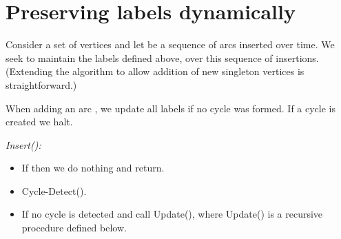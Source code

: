 \documentclass[11pt]{article}
\theoremstyle{plain}
\theoremstyle{definition}
\theoremstyle{remark}
\numberwithin{equation}{section}
\begin{document}
\section{Preserving labels dynamically} \label{sec:2directions}


Consider a set of vertices  and let  be a sequence of arcs inserted over time. We seek to
maintain the labels  defined above, over this sequence of
insertions. (Extending the algorithm to allow addition of new
singleton vertices is straightforward.)

When adding an arc , we update all labels if no cycle was
formed. If a cycle is created we halt.


\emph{Insert():}
\begin{itemize}
\item If  then we do nothing and return.
\item Cycle-Detect().
\item If no cycle is detected and  call Update(), where Update() is a recursive procedure defined below.
\end{itemize}
\end{document}

